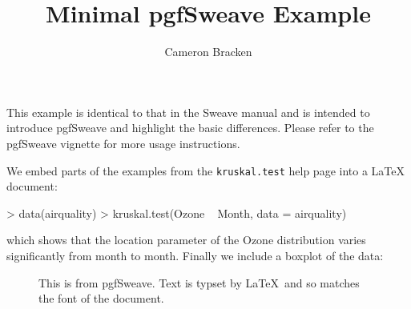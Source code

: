 \documentclass{article}
\title{Minimal pgfSweave Example}
\author{Cameron Bracken}
\begin{document}
\maketitle
This example is identical to that in the Sweave manual and is intended to 
introduce pgfSweave and highlight the basic differences.  Please refer to 
the pgfSweave vignette for more usage instructions. 

We embed parts of the examples from the \texttt{kruskal.test} help page 
into a \LaTeX{} document:

\begin{Schunk}
\begin{Sinput}
> data(airquality)
> kruskal.test(Ozone ~ Month, data = airquality)
\end{Sinput}
\end{Schunk}
which shows that the location parameter of the Ozone distribution varies 
significantly from month to month. Finally we include a boxplot of the data:


\begin{figure}[!ht]
\centering

\endpgfgraphicnamed
\caption{This is from pgfSweave. Text is typset by \LaTeX\ and so matches the
 font of the document.}
\end{figure}
\end{document}
